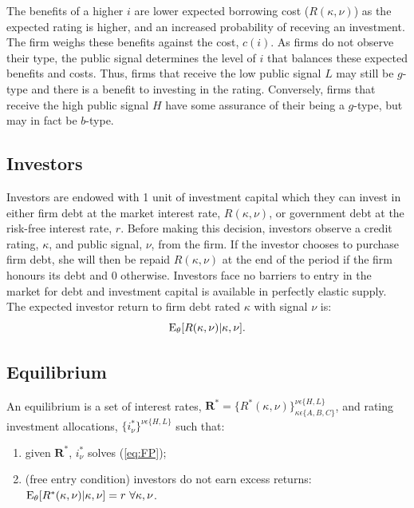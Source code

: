 \documentclass[notitlepage]{article}
\begin{document}
The benefits of a higher $i$ are lower expected borrowing cost ($R(\kappa,\nu)$) as the expected rating is higher, and an increased probability of receving an investment. The firm weighs these benefits against the cost, $c(i)$. As firms do not observe their type, the public signal determines the level of $i$ that balances these expected benefits and costs. Thus, firms that receive the low public signal $L$ may still be $g$-type and there is a benefit to investing in the rating. Conversely, firms that receive the high public signal $H$ have some assurance of their being a $g$-type, but may in fact be $b$-type. 

\subsection{Investors}
Investors are endowed with 1 unit of investment capital which they can invest in either firm debt at the market interest rate, $R(\kappa,\nu)$, or government debt at the risk-free interest rate, $r$. Before making this decision, investors observe a credit rating, $\kappa$, and public signal, $\nu$, from the firm. If the investor chooses to purchase firm debt, she will then be repaid $R(\kappa,\nu)$ at the end of the period if the firm honours its debt and 0 otherwise. Investors face no barriers to entry in the market for debt and investment capital is available in perfectly elastic supply. The expected investor return to firm debt rated $\kappa$ with signal $\nu$ is:
\begin{equation}
\textup{E}_{\theta} [R(\kappa,\nu)|\kappa,\nu ].
\end{equation}

\subsection{Equilibrium}

An equilibrium is a set of interest rates, $\mathbf{R}^{*}=\{ R^{*}(\kappa,\nu)\}_{\kappa\epsilon\{A,B,C\}}^{\nu\epsilon\{H,L\}}$, and rating investment allocations, $\{i^{*}_{\nu}\}^{\nu\epsilon\{H,L\}}$ such that:
\begin{enumerate}
	\item given $\mathbf{R}^{*}$, $i^{*}_{\nu}$ solves (\ref{eq:FP});
	\item (free entry condition) investors do not earn excess returns:\\$\textup{E}_{\theta} [R^{*}(\kappa,\nu)|\kappa,\nu ] = r \,\, \forall \kappa, \nu$.
\end{enumerate}
\end{document}
